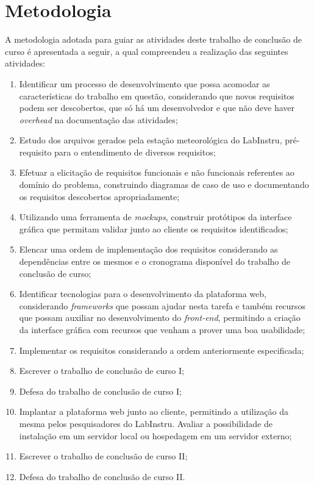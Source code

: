 \section{Metodologia} \label{sec:metodologia}

A metodologia adotada para guiar as atividades deste trabalho de conclusão de curso é apresentada a seguir, a qual compreendeu a realização das seguintes atividades:

\begin{enumerate}[label=\textbf{Atividade \arabic*}.,leftmargin=*,labelindent=1em]
	\item Identificar um processo de desenvolvimento que possa acomodar as características do trabalho em questão, considerando que novos requisitos podem ser descobertos, que só há um desenvolvedor e que não deve haver \emph{overhead} na documentação das atividades;
	\item Estudo dos arquivos gerados pela estação meteorológica do LabInstru, pré-requisito para o entendimento de diversos requisitos;
	\item Efetuar a elicitação de requisitos funcionais e não funcionais referentes ao domínio do problema, construindo diagramas de caso de uso e documentando os requisitos descobertos apropriadamente;
	\item Utilizando uma ferramenta de \emph{mockups}, construir protótipos da interface gráfica que permitam validar junto ao cliente os requisitos identificados;
	\item Elencar uma ordem de implementação dos requisitos considerando as dependências entre os mesmos e o cronograma disponível do trabalho de conclusão de curso;
	\item Identificar tecnologias para o desenvolvimento da plataforma web, considerando \emph{frameworks} que possam ajudar nesta tarefa e também recursos que possam auxiliar no desenvolvimento do \emph{front-end}, permitindo a criação da interface gráfica com recursos que venham a prover uma boa usabilidade;
	\item Implementar os requisitos considerando a ordem anteriormente especificada;
	\item Escrever o trabalho de conclusão de curso I;
	\item Defesa do trabalho de conclusão de curso I;
	\item Implantar a plataforma web junto ao cliente, permitindo a utilização da mesma pelos pesquisadores do LabInstru. Avaliar a possibilidade de instalação em um servidor local ou hospedagem em um servidor externo;
	\item Escrever o trabalho de conclusão de curso II;
	\item Defesa do trabalho de conclusão de curso II.
\end{enumerate}

